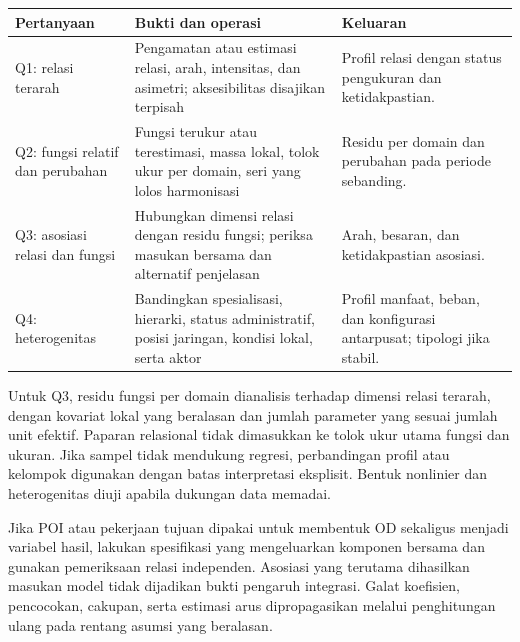 \documentclass[11pt,a4paper,oneside,openany,indonesian]{report}
\begin{document}
{\def\LTcaptype{none} %
\begin{longtable}[]{@{}
  >{\raggedright\arraybackslash}p{}
  >{\raggedright\arraybackslash}p{}
  >{\raggedright\arraybackslash}p{}@{}}
\toprule\noalign{}
\begin{minipage}[b]{\linewidth}\raggedright
Pertanyaan
\end{minipage} & \begin{minipage}[b]{\linewidth}\raggedright
Bukti dan operasi
\end{minipage} & \begin{minipage}[b]{\linewidth}\raggedright
Keluaran
\end{minipage} \\
\midrule\noalign{}
\endhead
\bottomrule\noalign{}
\endlastfoot
Q1: relasi terarah & Pengamatan atau estimasi relasi, arah, intensitas,
dan asimetri; aksesibilitas disajikan terpisah & Profil relasi dengan
status pengukuran dan ketidakpastian. \\
Q2: fungsi relatif dan perubahan & Fungsi terukur atau terestimasi,
massa lokal, tolok ukur per domain, seri yang lolos harmonisasi &
Residu per domain dan perubahan pada periode sebanding. \\
Q3: asosiasi relasi dan fungsi & Hubungkan dimensi relasi dengan residu
fungsi; periksa masukan bersama dan alternatif penjelasan & Arah,
besaran, dan ketidakpastian asosiasi. \\
Q4: heterogenitas & Bandingkan spesialisasi, hierarki, status
administratif, posisi jaringan, kondisi lokal, serta aktor & Profil
manfaat, beban, dan konfigurasi antarpusat; tipologi jika stabil. \\
\end{longtable}
}

Untuk Q3, residu fungsi per domain dianalisis terhadap dimensi relasi
terarah, dengan kovariat lokal yang beralasan dan jumlah parameter yang
sesuai jumlah unit efektif. Paparan relasional tidak dimasukkan ke tolok
ukur utama fungsi dan ukuran. Jika sampel tidak mendukung regresi,
perbandingan profil atau kelompok digunakan dengan batas interpretasi
eksplisit. Bentuk nonlinier dan heterogenitas diuji apabila dukungan
data memadai.

Jika POI atau pekerjaan tujuan dipakai untuk membentuk OD sekaligus
menjadi variabel hasil, lakukan spesifikasi yang mengeluarkan komponen
bersama dan gunakan pemeriksaan relasi independen. Asosiasi yang
terutama dihasilkan masukan model tidak dijadikan bukti pengaruh
integrasi. Galat koefisien, pencocokan, cakupan, serta estimasi arus
dipropagasikan melalui penghitungan ulang pada rentang asumsi yang
beralasan.
\end{document}
